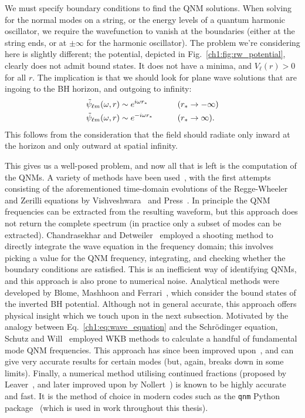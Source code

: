 We must specify boundary conditions to find the QNM solutions.
When solving for the normal modes on a string, or the energy levels of a quantum harmonic oscillator, we require the wavefunction to vanish at the boundaries (either at the string ends, or at $\pm \infty$ for the harmonic oscillator).
The problem we're considering here is slightly different; the potential, depicted in Fig.~\ref{ch1:fig:rw_potential}, clearly does not admit bound states. 
It does not have a minima, and $V_\ell(r) > 0$ for all $r$.
The implication is that we should look for plane wave solutions that are ingoing to the BH horizon, and outgoing to infinity:
\begin{alignat}{2}
    &\tilde{\psi}_{\ell m}(\omega, r) \sim e^{i \omega r_*} \qquad &&\qty(r_* \rightarrow -\infty) \nonumber \\
    &\tilde{\psi}_{\ell m}(\omega, r) \sim e^{- i \omega r_*} \qquad &&\qty(r_* \rightarrow \infty).
\end{alignat}
This follows from the consideration that the field should radiate only inward at the horizon and only outward at spatial infinity.

This gives us a well-posed problem, and now all that is left is the computation of the QNMs. 
A variety of methods have been used~\cite{Kokkotas:1999bd, Berti:2004md}, with the first attempts consisting of the aforementioned time-domain evolutions of the Regge-Wheeler and Zerilli equations by Vishveshwara~\cite{Vishveshwara:1970zz} and Press~\cite{Press:1971wr}. 
In principle the QNM frequencies can be extracted from the resulting waveform, but this approach does not return the complete spectrum (in practice only a subset of modes can be extracted).
Chandrasekhar and Detweiler~\cite{Chandrasekhar:1975zza} employed a shooting method to directly integrate the wave equation in the frequency domain; this involves picking a value for the QNM frequency, integrating, and checking whether the boundary conditions are satisfied. 
This is an inefficient way of identifying QNMs, and this approach is also prone to numerical noise.
Analytical methods were developed by Blome, Mashhoon and Ferrari~\cite{BLOME1984231, Ferrari:1984ozr, Ferrari:1984zz}, which consider the bound states of the inverted BH potential. 
Although not in general accurate, this approach offers physical insight which we touch upon in the next subsection.
Motivated by the analogy between Eq.~\ref{ch1:eq:wave_equation} and the Schr\"{o}dinger equation, Schutz and Will~\cite{Schutz:1985km} employed WKB methods to calculate a handful of fundamental mode QNM frequencies.
This approach has since been improved upon~\cite{Iyer:1986np, Matyjasek:2017psv, Konoplya:2019hlu}, 
and can give very accurate results for certain modes (but, again, breaks down in some limits). 
Finally, a numerical method utilising continued fractions (proposed by Leaver~\cite{Leaver:1985ax}, and later improved upon by Nollert~\cite{Nollert:1993zz}) is known to be highly accurate and fast.
It is the method of choice in modern codes such as the \texttt{qnm} Python package~\cite{Stein:2019mop} (which is used in work throughout this thesis).

